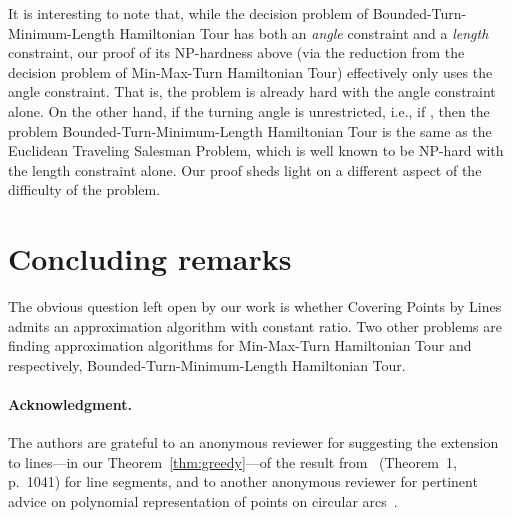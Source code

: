\documentclass[letterpaper,11pt]{article}
\def\ie{{i.e.}}
\begin{document}
\medskip
It is interesting to note that,
while the decision problem of {\sc Bounded-Turn-Minimum-Length Hamiltonian Tour}
has both an \emph{angle} constraint and a \emph{length} constraint,
our proof of its NP-hardness above
(via the reduction from the decision problem of {\sc Min-Max-Turn Hamiltonian Tour})
effectively only uses the angle constraint.
That is, the problem is already hard with the angle constraint alone.
On the other hand,
if the turning angle is unrestricted, \ie, if ,
then the problem {\sc Bounded-Turn-Minimum-Length Hamiltonian Tour}
is the same as the {\sc Euclidean Traveling Salesman Problem},
which is well known to be NP-hard with the length constraint alone.
Our proof
sheds light on a different aspect of the difficulty of the problem.


\section{Concluding remarks}

The obvious question left open by our work is whether 
{\sc Covering Points by Lines} admits an approximation algorithm with
constant ratio. 
Two other problems are finding approximation algorithms for 
{\sc Min-Max-Turn Hamiltonian Tour} and respectively, 
{\sc Bounded-Turn-Minimum-Length Hamiltonian Tour}.


\paragraph{Acknowledgment.}
The authors are grateful to an anonymous reviewer for suggesting the extension
to lines---in our Theorem~\ref{thm:greedy}---of the result
from~\cite{BLWM12} (Theorem~1, p.~1041) for line segments,
and to another anonymous reviewer for pertinent advice on polynomial
representation of points on circular arcs~\cite{CDR92,Bu98}.
\end{document}
